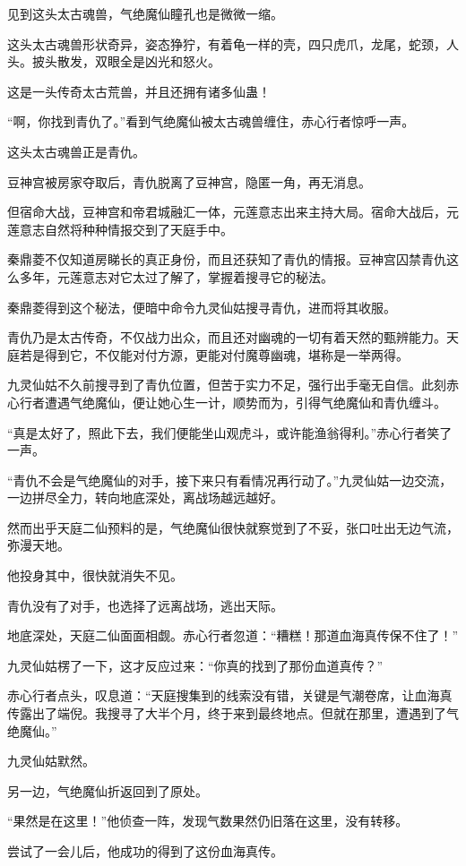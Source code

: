 \begin{this_body}
见到这头太古魂兽，气绝魔仙瞳孔也是微微一缩。

这头太古魂兽形状奇异，姿态狰狞，有着龟一样的壳，四只虎爪，龙尾，蛇颈，人头。披头散发，双眼全是凶光和怒火。

这是一头传奇太古荒兽，并且还拥有诸多仙蛊！

“啊，你找到青仇了。”看到气绝魔仙被太古魂兽缠住，赤心行者惊呼一声。

这头太古魂兽正是青仇。

豆神宫被房家夺取后，青仇脱离了豆神宫，隐匿一角，再无消息。

但宿命大战，豆神宫和帝君城融汇一体，元莲意志出来主持大局。宿命大战后，元莲意志自然将种种情报交到了天庭手中。

秦鼎菱不仅知道房睇长的真正身份，而且还获知了青仇的情报。豆神宫囚禁青仇这么多年，元莲意志对它太过了解了，掌握着搜寻它的秘法。

秦鼎菱得到这个秘法，便暗中命令九灵仙姑搜寻青仇，进而将其收服。

青仇乃是太古传奇，不仅战力出众，而且还对幽魂的一切有着天然的甄辨能力。天庭若是得到它，不仅能对付方源，更能对付魔尊幽魂，堪称是一举两得。

九灵仙姑不久前搜寻到了青仇位置，但苦于实力不足，强行出手毫无自信。此刻赤心行者遭遇气绝魔仙，便让她心生一计，顺势而为，引得气绝魔仙和青仇缠斗。

“真是太好了，照此下去，我们便能坐山观虎斗，或许能渔翁得利。”赤心行者笑了一声。

“青仇不会是气绝魔仙的对手，接下来只有看情况再行动了。”九灵仙姑一边交流，一边拼尽全力，转向地底深处，离战场越远越好。

然而出乎天庭二仙预料的是，气绝魔仙很快就察觉到了不妥，张口吐出无边气流，弥漫天地。

他投身其中，很快就消失不见。

青仇没有了对手，也选择了远离战场，逃出天际。

地底深处，天庭二仙面面相觑。赤心行者忽道：“糟糕！那道血海真传保不住了！”

九灵仙姑楞了一下，这才反应过来：“你真的找到了那份血道真传？”

赤心行者点头，叹息道：“天庭搜集到的线索没有错，关键是气潮卷席，让血海真传露出了端倪。我搜寻了大半个月，终于来到最终地点。但就在那里，遭遇到了气绝魔仙。”

九灵仙姑默然。

另一边，气绝魔仙折返回到了原处。

“果然是在这里！”他侦查一阵，发现气数果然仍旧落在这里，没有转移。

尝试了一会儿后，他成功的得到了这份血海真传。


\end{this_body}

